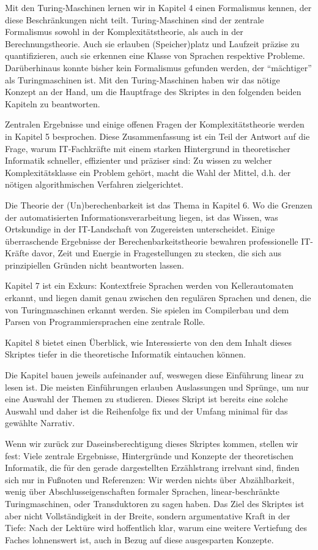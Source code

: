 Mit den Turing-Maschinen lernen wir in Kapitel 4 einen Formalismus kennen,
der diese Beschränkungen nicht teilt.
Turing-Maschinen sind der zentrale Formalismus sowohl
in der Komplexitätstheorie,
als auch in der Berechnungstheorie.
Auch sie erlauben (Speicher)platz und Laufzeit präzise zu quantifizieren,
auch sie erkennen eine Klasse von Sprachen respektive Probleme.
Darüberhinaus konnte bisher kein Formalismus gefunden werden,
der ``mächtiger'' als Turingmaschinen ist.
Mit den Turing-Maschinen haben wir das nötige Konzept an der Hand,
um die Hauptfrage des Skriptes in den folgenden beiden Kapiteln zu beantworten.

Zentralen Ergebnisse und einige offenen Fragen der Komplexitätstheorie
werden in Kapitel 5 besprochen.
Diese Zusammenfassung ist ein Teil der Antwort auf die Frage,
warum IT-Fachkräfte mit einem starken Hintergrund in theoretischer Informatik
schneller, effizienter und präziser sind:
Zu wissen zu welcher Komplexitätsklasse ein Problem gehört,
macht die Wahl der Mittel, d.h. der nötigen algorithmischen Verfahren zielgerichtet.

Die Theorie der (Un)berechenbarkeit ist das Thema in Kapitel 6.
Wo die Grenzen der automatisierten Informationsverarbeitung liegen,
ist das Wissen,
was Ortskundige in der IT-Landschaft von Zugereisten unterscheidet.
Einige überraschende Ergebnisse der Berechenbarkeitstheorie
bewahren professionelle IT-Kräfte davor,
Zeit und Energie in Fragestellungen zu stecken,
die sich aus prinzipiellen Gründen nicht beantworten lassen.

Kapitel 7 ist ein Exkurs: Kontextfreie Sprachen werden von Kellerautomaten erkannt,
und liegen damit genau zwischen den regulären Sprachen
und denen, die von Turingmaschinen erkannt werden.
Sie spielen im Compilerbau und dem Parsen von Programmiersprachen eine zentrale Rolle.

Kapitel 8 bietet einen Überblick,
wie Interessierte von den dem Inhalt dieses Skriptes tiefer in die theoretische Informatik
eintauchen können.

Die Kapitel bauen jeweils aufeinander auf,
weswegen diese Einführung linear zu lesen ist.
Die meisten Einführungen erlauben Auslassungen und Sprünge,
um nur eine Auswahl der Themen zu studieren.
Dieses Skript ist bereits eine solche Auswahl
und daher ist die Reihenfolge fix
und der Umfang minimal für das gewählte Narrativ.

Wenn wir zurück zur Daseinsberechtigung dieses Skriptes kommen,
stellen wir fest:
Viele zentrale Ergebnisse, Hintergründe und Konzepte
der theoretischen Informatik,
die für den gerade dargestellten Erzählstrang irrelvant sind,
finden sich nur in Fußnoten und Referenzen:
Wir werden nichts über Abzählbarkeit,
wenig über Abschlusseigenschaften formaler Sprachen,
linear-beschränkte Turingmaschinen,
oder Transduktoren zu sagen haben.
Das Ziel des Skriptes ist aber nicht Vollständigkeit in der Breite,
sondern argumentative Kraft in der Tiefe:
Nach der Lektüre wird hoffentlich klar,
warum eine weitere Vertiefung des Faches lohnenswert ist,
auch in Bezug auf diese ausgesparten Konzepte.

